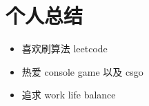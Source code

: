 \documentclass{resume}
\begin{document}

\section{个人总结}
\begin{itemize}[parsep=0.2ex]
  \item 喜欢刷算法 leetcode
  \item 热爱 console game 以及 csgo
  \item 追求 work life balance
\end{itemize}

%
%
\end{document}
